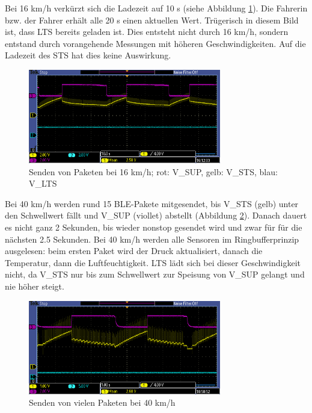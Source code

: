 Bei 16 km/h verkürzt sich die Ladezeit auf 10 s (siehe Abbildung \ref{paket_16kmh}). Die Fahrerin bzw. der Fahrer erhält alle 20 s einen aktuellen Wert. Trügerisch in diesem Bild ist, dass LTS bereits geladen ist. Dies entsteht nicht durch 16 km/h, sondern entstand durch vorangehende Messungen mit höheren Geschwindigkeiten. Auf die Ladezeit des STS hat dies keine Auswirkung.

\begin{figure}[ht]
   \includegraphics[width=0.75\textwidth]{4Resultate/imag/pic2.PNG}
    \caption{Senden von Paketen bei 16 km/h; rot: V\_SUP, gelb: V\_STS, blau: V\_LTS}
    \label{paket_16kmh}
\end{figure}

Bei 40 km/h werden rund 15 BLE-Pakete mitgesendet, bis V\_STS (gelb) unter den Schwellwert fällt und V\_SUP (viollet) abstellt (Abbildung \ref{paket_40kmh}). Danach dauert es nicht ganz 2 Sekunden, bis wieder nonstop gesendet wird und zwar für für die nächsten 2.5 Sekunden. Bei 40 km/h werden alle Sensoren im Ringbufferprinzip ausgelesen: beim ersten Paket wird der Druck aktualisiert, danach die Temperatur, dann die Luftfeuchtigkeit. LTS lädt sich bei dieser Geschwindigkeit nicht, da V\_STS nur bis zum Schwellwert zur Speisung von V\_SUP gelangt und nie höher steigt.

\begin{figure}[ht]
   \includegraphics[width=0.75\textwidth]{4Resultate/imag/pic4.PNG}
    \caption{Senden von vielen Paketen bei 40 km/h}
    \label{paket_40kmh}
\end{figure}


